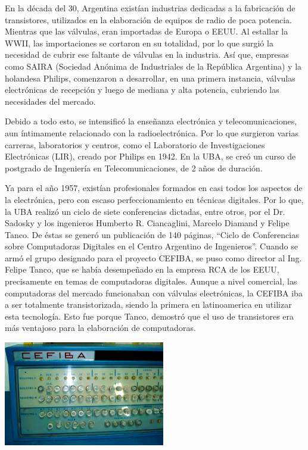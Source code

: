\documentclass[%
 	final,
%
	notitlepage,
	narroweqnarray,
	inline,
 	twoside,
	]{ieee}
\begin{document}
En la d\'ecada del 30, Argentina exist\'ian industrias dedicadas a la fabricaci\'on de transistores, utilizados en la elaboraci\'on de equipos de radio de poca potencia. Mientras que las v\'alvulas, eran importadas de Europa o EEUU. Al estallar la WWII, las importaciones se cortaron en su totalidad, por lo que surgi\'o la necesidad de cubrir ese faltante de v\'alvulas en la industria. As\'i que, empresas como SAIRA (Sociedad An\'onima de Industriales de la Rep\'ublica Argentina) y la holandesa Philips, comenzaron a desarrollar, en una primera instancia, v\'alvulas electr\'onicas de recepci\'on y luego de mediana y alta potencia, cubriendo las necesidades del mercado.

Debido a todo esto, se intensific\'o la ense\~nanza electr\'onica y telecomunicaciones, aun \'intimamente relacionado con la radioelectr\'onica. Por lo que surgieron varias carreras, laboratorios y centros, como el Laboratorio de Investigaciones Electr\'onicas (LIR), creado por Philips en 1942. En la UBA, se cre\'o un curso de postgrado de Ingenier\'ia en Telecomunicaciones, de 2 a\~nos de duraci\'on.

Ya para el a\~no 1957, exist\'ian profesionales formados en casi todos los aspectos de la electr\'onica, pero con escaso perfeccionamiento en t\'ecnicas digitales. Por lo que, la UBA realiz\'o un ciclo de siete conferencias dictadas, entre otros, por el Dr. Sadosky y los ingenieros Humberto R. Ciancaglini, Marcelo Diamand y Felipe Tanco. De \'estas se gener\'o un publicaci\'on de 140 p\'aginas, ``Ciclo de Conferencias sobre Computadoras Digitales en el Centro Argentino de Ingenieros''.
Cuando se arm\'o el grupo designado para el proyecto CEFIBA, se puso como director al Ing. Felipe Tanco, que se hab\'ia desempe\~nado en la empresa RCA de los EEUU, precisamente en temas de computadoras digitales. Aunque a nivel comercial, las computadoras del mercado funcionaban con v\'alvulas electr\'onicas, la CEFIBA iba a ser totalmente transistorizada, siendo la primera en latinoamerica en utilizar esta tecnolog\'ia. Esto fue porque Tanco, demostr\'o que el uso de transistores era m\'as ventajoso para la elaboraci\'on de computadoras.

\begin{center}\includegraphics[width=200pt, height=130pt]{cefiba.png}\end{center}
\end{document}
